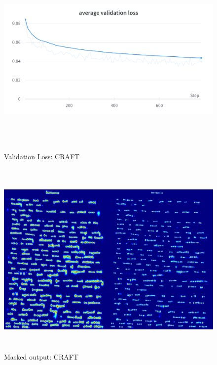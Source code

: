 \begin{figure}[H]
	\includegraphics[width=475pt,height=275pt]{Validation Loss CRAFT.png}
	\caption{Validation Loss: CRAFT}
\end{figure}


\begin{figure}[H]
	\includegraphics[width=475pt,height=275pt]{craft_mask.jpg}
	\caption{Masked output: CRAFT}
\end{figure}

